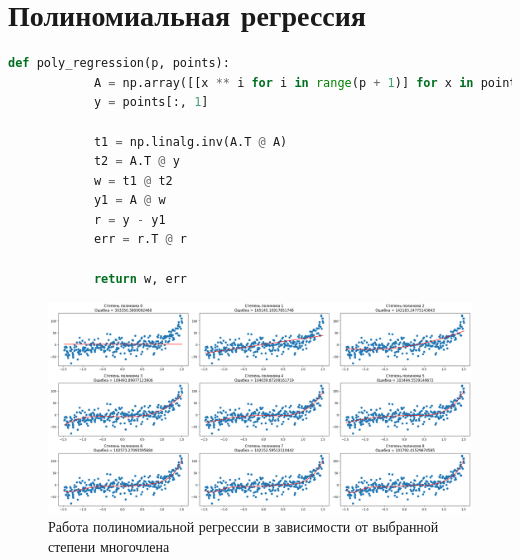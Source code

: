 \documentclass[a4paper,14pt,oneside,openany]{memoir}
\begin{document}
	\newpage
	\section{Полиномиальная регрессия}
	
	\begin{lstlisting}[language=Python, caption=Реализация простой полиномиальной регрессии методом наименьших квадратов]
		def poly_regression(p, points):
		    A = np.array([[x ** i for i in range(p + 1)] for x in points[:, 0]])
		    y = points[:, 1]
		
		    t1 = np.linalg.inv(A.T @ A)
		    t2 = A.T @ y
		    w = t1 @ t2
		    y1 = A @ w
		    r = y - y1
		    err = r.T @ r
		
		    return w, err	
	\end{lstlisting}
	
	\begin{figure}[ht]
		\centering
		\includegraphics[width=1\textwidth]{img/4_1.png}
	    \caption{Работа полиномиальной регрессии в зависимости от выбранной степени многочлена}
	\end{figure}
	
\end{document}
